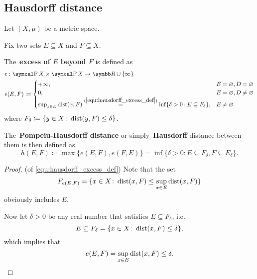 \subsection{Hausdorff distance}\label{subsec:hausdorff_distance}

Let \( (X, \mu) \) be a metric space.

\begin{definition}\label{def:hausdorff_distance}\cite[144]{Dontchev2014}
  Fix two sets \( E \subseteq X \) and \( F \subseteq X \).

  The~\textbf{excess of \( E \) beyond \( F \)} is defined as
  \begin{align}\label{equ:hausdorff_excess_def}
    &e: \Power X \times \Power X \to \BB{R} \cup \{ \infty \} \\ \nonumber
    &e(E, F) \coloneqq \begin{cases}
      +\infty, &E = \varnothing, D = \varnothing \\
      0, &E = \varnothing, D \neq \varnothing \\
      \sup_{x \in E} \Dist(x, F) \stackrel{(\ref{equ:hausdorff_excess_def})}{=} \inf \{\delta > 0 \colon E \subseteq F_\delta \}, &E \neq \varnothing \nonumber\refstepcounter{equation}
    \end{cases}
  \end{align}
  where \( F_\delta \coloneqq \{ y \in X \colon \operatorname{dist}(y, F) \leq \delta \} \).

  The~\textbf{Pompeiu-Hausdorff distance} or simply~\textbf{Hausdorff} distance between them is then defined as
  \begin{equation*}
    h(E, F) \coloneqq \max\{ e(E, F), e(F, E) \} = \inf \{\delta > 0 \colon E \subseteq F_\delta, F \subseteq E_\delta \}.
  \end{equation*}
\end{definition}
\begin{proof}(of \ref{equ:hausdorff_excess_def})
  Note that the set
  \begin{equation*}
    F_{e(E, F)} = \{ x \in X \colon \operatorname{dist}(x, F) \leq \sup_{x \in E} \operatorname{dist}(x, F) \}
  \end{equation*}
  obviously includes \( E \).

  Now let \( \delta > 0 \) be any real number that satisfies \( E \subseteq F_\delta \), i.e.
  \begin{equation*}
    E \subseteq F_\delta = \{ x \in X \colon \operatorname{dist}(x, F) \leq \delta \},
  \end{equation*}
  which implies that
  \begin{equation*}
    e(E, F) = \sup_{x \in E} \operatorname{dist}(x, F) \leq \delta.
  \end{equation*}
\end{proof}

